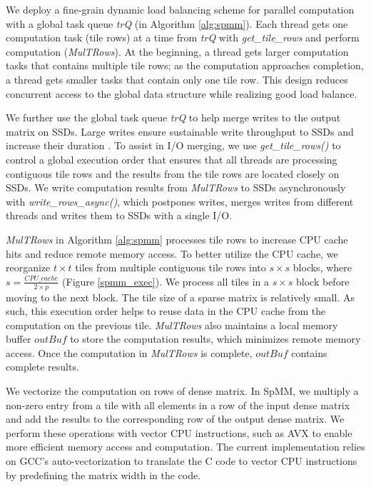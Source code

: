 We deploy a fine-grain dynamic load balancing scheme for parallel computation
with a global task queue \textit{trQ} (in Algorithm \ref{alg:spmm}). Each thread
gets one computation task (tile rows) at a time from \textit{trQ} with
\textit{get\_tile\_rows} and perform computation (\textit{MulTRows}).
At the beginning, a thread gets larger computation tasks that contains multiple
tile rows; as the computation approaches completion, a thread gets smaller
tasks that contain only one tile row. This design reduces concurrent access to
the global data structure while realizing good load balance.

We further use the global task queue \textit{trQ} to help merge writes to
the output matrix on SSDs. Large writes ensure sustainable write throughput to
SSDs and increase their duration \cite{sfs}. To assist in I/O merging, we use
\textit{get\_tile\_rows()} to control a global execution
order that ensures that all threads are processing contiguous tile rows and
the results from the tile rows are located closely on SSDs.
We write computation results from \textit{MulTRows} to SSDs
asynchronously with \textit{write\_rows\_async()}, which postpones writes,
merges writes from different threads and writes them to SSDs with a single I/O.

\textit{MulTRows} in Algorithm \ref{alg:spmm} processes tile rows to increase
CPU cache hits and reduce remote memory access. To better utilize the CPU cache,
we reorganize $t \times t$
tiles from multiple contiguous tile rows into $s \times s$ blocks, where
$s = \frac{CPU\_cache}{2 \times p}$ (Figure \ref{spmm_exec}). We process all
tiles in a $s \times s$ block before moving to the next block. The tile size
of a sparse matrix is relatively small. As such, this execution order helps to
reuse data in the CPU cache from the computation on the previous tile.
\textit{MulTRows} also maintains
a local memory buffer $outBuf$ to store the computation results,
which minimizes remote memory access. Once the computation in \textit{MulTRows}
is complete, $outBuf$ contains complete results.

We vectorize the computation on rows of dense matrix.
In SpMM, we multiply a non-zero entry from a tile with all elements in
a row of the input dense matrix and add the results to the corresponding row
of the output dense matrix.
We perform these operations with vector CPU instructions, such as
AVX \cite{avx} to enable more efficient memory access and computation.
The current implementation relies on GCC's auto-vectorization
to translate the C code to vector CPU instructions by predefining the matrix
width in the code.

